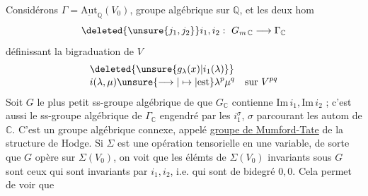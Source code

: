 Considérons $\Gamma=\underline{\mathrm{Aut}}_{\mathbb Q}(V_0)$, groupe algébrique %
sur $\mathbb Q$, et les deux hom %
\[
\deleted{\unsure{j_1,j_2}}i_1,i_2:\ G_{m\,\mathbb C}\longrightarrow\Gamma_{\mathbb C} %
\]
définissant la bigraduation de $V$ %
\[
\begin{aligned}&\deleted{\unsure{g_{\lambda}(x)|i_1(\lambda)}}\\[-2pt]&i(\lambda,\mu)\unsure{\longrightarrow|\mapsto|\text{est}}\lambda^p\mu^q\quad\text{sur }V^{pq}\end{aligned} %
\]
Soit $G$ le plus petit ss-groupe algébrique de \inserted{$\Gamma$} %
 que $G_{\mathbb C}$ contienne $\mathrm{Im}\,i_1,\mathrm{Im}\,i_2$ ; %
 c'est aussi le ss-groupe algébrique de %
 $\Gamma_{\mathbb C}$  engendré par les $i_1^\sigma$, $\sigma$ parcourant %
les  autom de $\mathbb C$. C'est un groupe %
algébrique connexe, appelé \uline{groupe de Mumford-Tate} %
de la structure de Hodge.  Si $\Sigma$ est %
une opération tensorielle en une variable, %
de sorte que $G$ opère sur $\Sigma(V_0)$, %
on voit que les élémts de $\Sigma(V_0)$ invariants %
sous $G$ sont  ceux qui sont %
invariants par  $i_1,i_2$, i.e. qui sont de %
bidegré $0,0$. Cela permet de voir que %

